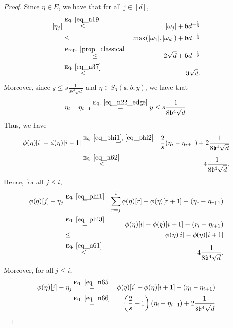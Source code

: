 \documentclass[11pt,letterpaper]{article}
\begin{document}
\begin{proof}


Since $\eta \in E$, we have that for all $j \in [d]$,
%
\begin{eqnarray}\label{eq_n68}
|\eta_j| &\stackrel{\textrm{Eq. } \eqref{eq_n19}}{\leq}& |\omega_j| + \mathfrak{b} d^{-\frac{1}{6}}\nonumber\\
%
 &\leq& \max(|\omega_1|, |\omega_d|) + \mathfrak{b} d^{-\frac{1}{6}}\nonumber\\
%
&\stackrel{\textrm{Prop. } \ref{prop_classical}}{\leq}& 2 \sqrt{d} + \mathfrak{b} d^{-\frac{1}{6}}\nonumber\\
%
&\stackrel{\textrm{Eq. } \eqref{eq_n37}}{\leq}& 3 \sqrt{d}.
%
\end{eqnarray}
Moreover, since  $y \leq s\frac{1}{8\mathfrak{b}^4\sqrt{d} }$ and $\eta \in  S_3(a,b;y)$, 
%
we have that
%
\begin{equation}\label{eq_n62}
    \eta_i-\eta_{i+1} \stackrel{\textrm{Eq. } \eqref{eq_n22_edge}}{=} y \leq s\frac{1}{8\mathfrak{b}^4\sqrt{d} }.
    \end{equation}
Thus, we have
%
\begin{eqnarray}
\phi(\eta)[i]- \phi(\eta)[i+1] &\stackrel{\textrm{Eq. } \eqref{eq_phi1},\, \, \eqref{eq_phi2}}{=}& \frac{2}{s}(\eta_{i}- \eta_{i+1})+ 2\frac{1}{8\mathfrak{b}^4\sqrt{d}} \label{eq_n66}\\
%
&\stackrel{\textrm{Eq. } \eqref{eq_n62}}{\leq}& 4\frac{1}{8\mathfrak{b}^4\sqrt{d}}. \label{eq_n61}
\end{eqnarray}
%
Hence, for all $j\leq i$,
%
\begin{eqnarray}
\phi(\eta)[j] - \eta_j &\stackrel{\textrm{Eq. } \eqref{eq_phi1}}{=}& \sum_{r= j}^i \phi(\eta)[r]- \phi(\eta)[r+1] - (\eta_r - \eta_{r+1})\nonumber\\
%
&\stackrel{\textrm{Eq. } \eqref{eq_phi3}}{=}& \phi(\eta)[i]- \phi(\eta)[i+1] - (\eta_i- \eta_{i+1}) \label{eq_n65}\\
%
&\leq& \phi(\eta)[i]- \phi(\eta)[i+1] \nonumber\\
%
&\stackrel{\textrm{Eq. } \eqref{eq_n61}}{\leq}& 4\frac{1}{8\mathfrak{b}^4\sqrt{d}}. \label{eq_n63}
\end{eqnarray}
Moreover, for all $j\leq i$,
\begin{eqnarray}
\phi(\eta)[j] - \eta_j &\stackrel{\textrm{Eq. } \eqref{eq_n65}}{=}&  \phi(\eta)[i]- \phi(\eta)[i+1] - (\eta_i- \eta_{i+1})\nonumber\\
&\stackrel{\textrm{Eq. } \eqref{eq_n66}}{=}& \left(\frac{2}{s}-1\right)(\eta_{i}- \eta_{i+1})+ 2\frac{1}{8\mathfrak{b}^4\sqrt{d}} \nonumber\\

\end{eqnarray}
\end{proof}
\end{document}
